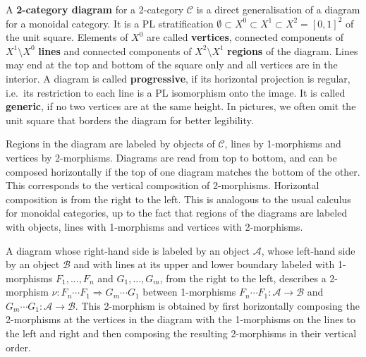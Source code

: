 \documentclass[1.5pt, a4paper]{article}
\newcommand{\mac}{\mathcal C}
\begin{document}
A {\bf 2-category diagram} for a 2-category $\mac$  is a direct generalisation of a diagram for a monoidal category. It is a PL stratification $\emptyset\subset X^0\subset X^1\subset X^2=[0,1]^2$ of  the unit square. Elements of $X^0$ are called {\bf vertices}, connected components of $X^1\setminus X^0$ {\bf lines} and connected components of $X^2\setminus X^1$ {\bf regions} of the diagram.  Lines may end at the top and bottom of the square only and all vertices are  in the interior. A diagram is called  {\bf progressive}, if its horizontal projection is regular, i.e.~its restriction to each line is a PL isomorphism onto the image. It is called {\bf generic}, if no two vertices are at the same height.  In pictures, we often omit the  unit square that borders  the diagram for better legibility.

 Regions in the diagram are labeled by objects of $\mac$, lines by 1-morphisms and vertices by 2-morphisms. Diagrams are read from top to bottom, and can be composed horizontally if the top of one diagram matches the bottom of the other. This corresponds to the vertical composition of 2-morphisms. Horizontal composition is from the right to the left. This is analogous to the usual calculus for monoidal categories, up to the fact that regions of the diagrams are labeled with objects, lines with 1-morphisms and vertices with 2-morphisms. 
 
A  diagram whose right-hand side is labeled by an object $\mathcal A$, whose left-hand side by an object $\mathcal B$ and with   lines at its upper and lower boundary labeled with 1-morphisms $F_1,...,F_n$  and  $G_1,...,G_m$,  from the right to the left, describes a 2-morphism $\nu: F_n\cdots F_1\Rightarrow G_m\cdots G_1$ between 1-morphisms $F_n\cdots F_1:\mathcal A\to\mathcal B$ and $G_m\cdots G_1:\mathcal A\to\mathcal B$.
This 2-morphism is obtained by first  horizontally composing the 2-morphisms at the vertices in the diagram with the 1-morphisms on the lines to the left and right and then composing the resulting 2-morphisms  in their vertical order. 
\end{document}
